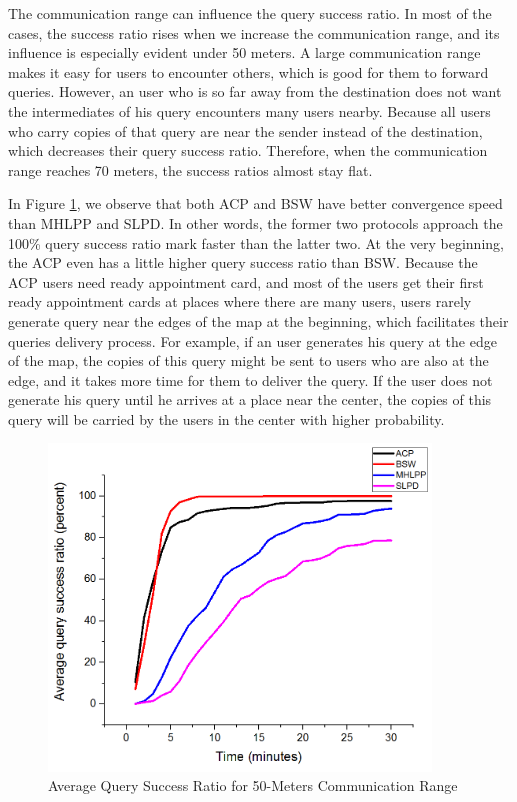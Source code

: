 The communication range can influence the query success ratio. In most of the cases, the success ratio rises when we increase the communication range, and its influence is especially evident under 50 meters. A large communication range makes it easy for users to encounter others, which is good for them to forward queries. However, an user who is so far away from the destination does not want the intermediates of his query encounters many users nearby. Because all users who carry copies of that query are near the sender instead of the destination, which decreases their query success ratio. Therefore, when the communication range reaches 70 meters, the success ratios almost stay flat.

In Figure \ref{fig:F416AverageQuerySuccessRatioWith50MetersCommunicationRatio}, we observe that both ACP and BSW have better convergence speed than MHLPP and SLPD. In other words, the former two protocols approach the 100\% query success ratio mark faster than the latter two. At the very beginning, the ACP even has a little higher query success ratio than BSW. Because the ACP users need ready appointment card, and most of the users get their first ready appointment cards at places where there are many users, users rarely generate query near the edges of the map at the beginning, which facilitates their queries delivery process. For example, if an user generates his query at the edge of the map, the copies of this query might be sent to users who are also at the edge, and it takes more time for them to deliver the query. If the user does not generate his query until he arrives at a place near the center, the copies of this query will be carried by the users in the center with higher probability.

\begin{figure} [hbtp]
\centering 
\includegraphics[width=4.0in]{figures/F416AverageQuerySuccessRatioWith50MetersCommunicationRatio.png}
\caption{Average Query Success Ratio for 50-Meters Communication Range} 
\label{fig:F416AverageQuerySuccessRatioWith50MetersCommunicationRatio} %
\end{figure}

